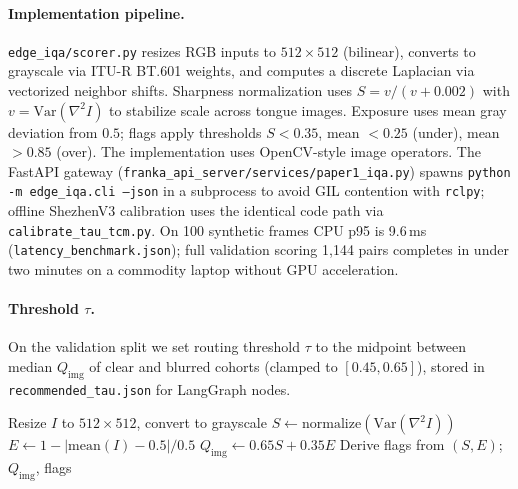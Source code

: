 \paragraph{Implementation pipeline.}
\texttt{edge\_iqa/scorer.py} resizes RGB inputs to $512\times512$ (bilinear), converts to grayscale via ITU-R BT.601 weights, and computes a discrete Laplacian via vectorized neighbor shifts.
Sharpness normalization uses $S = v/(v+0.002)$ with $v=\mathrm{Var}(\nabla^2 I)$ to stabilize scale across tongue images.
Exposure uses mean gray deviation from $0.5$; flags apply thresholds $S<0.35$, mean $<0.25$ (under), mean $>0.85$ (over).
The implementation uses OpenCV-style image operators. The FastAPI gateway (\texttt{franka\_api\_server/services/paper1\_iqa.py}) spawns \texttt{python -m edge\_iqa.cli --json} in a subprocess to avoid GIL contention with \texttt{rclpy}; offline ShezhenV3 calibration uses the identical code path via \texttt{calibrate\_tau\_tcm.py}.
On 100 synthetic frames CPU p95 is 9.6\,ms (\texttt{latency\_benchmark.json}); full validation scoring 1{,}144 pairs completes in under two minutes on a commodity laptop without GPU acceleration.

\paragraph{Threshold $\tau$.}
On the validation split we set routing threshold $\tau$ to the midpoint between median $Q_{\mathrm{img}}$ of clear and blurred cohorts (clamped to $[0.45,0.65]$), stored in \texttt{recommended\_tau.json} for LangGraph nodes.

\begin{algorithm}[t]
\caption{Edge-IQA scoring}
\begin{algorithmic}[1]
\STATE Resize $I$ to $512\times512$, convert to grayscale
\STATE $S \leftarrow \mathrm{normalize}(\mathrm{Var}(\nabla^2 I))$
\STATE $E \leftarrow 1 - | \mathrm{mean}(I) - 0.5 | / 0.5$
\STATE $Q_{\mathrm{img}} \leftarrow 0.65 S + 0.35 E$
\STATE Derive flags from $(S,E)$; \RETURN $Q_{\mathrm{img}}$, flags
\end{algorithmic}
\end{algorithm}
